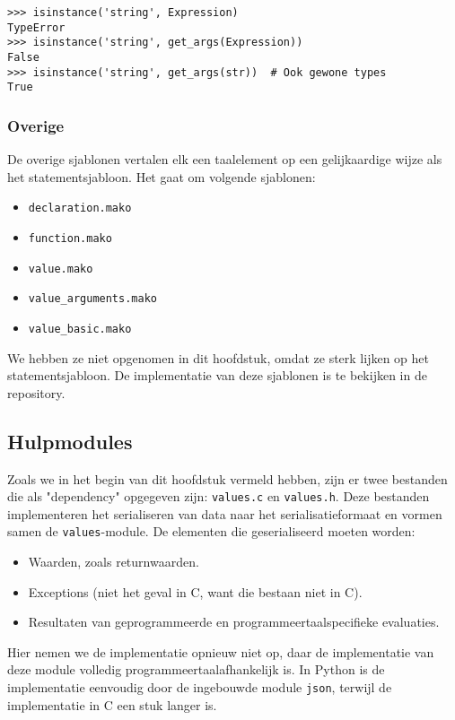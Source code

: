 \begin{verbatim}
>>> isinstance('string', Expression)
TypeError
>>> isinstance('string', get_args(Expression))
False
>>> isinstance('string', get_args(str))  # Ook gewone types
True
\end{verbatim}

\subsubsection{Overige}

De overige sjablonen vertalen elk een taalelement op een gelijkaardige wijze als het statementsjabloon.
Het gaat om volgende sjablonen:

\begin{itemize}
    \item \texttt{declaration.mako}
    \item \texttt{function.mako}
    \item \texttt{value.mako}
    \item \texttt{value\_arguments.mako}
    \item \texttt{value\_basic.mako}
\end{itemize}

We hebben ze niet opgenomen in dit hoofdstuk, omdat ze sterk lijken op het statementsjabloon.
De implementatie van deze sjablonen is te bekijken in de repository.

\subsection{Hulpmodules}\label{subsec:hulpmodules}

Zoals we in het begin van dit hoofdstuk vermeld hebben, zijn er twee bestanden die als "dependency" opgegeven zijn: \texttt{values.c} en \texttt{values.h}.
Deze bestanden implementeren het serialiseren van data naar het serialisatieformaat en vormen samen de \texttt{values}-module.
De elementen die geserialiseerd moeten worden:

\begin{itemize}
    \item Waarden, zoals returnwaarden.
    \item Exceptions (niet het geval in C, want die bestaan niet in C).
    \item Resultaten van geprogrammeerde en programmeertaalspecifieke evaluaties.
\end{itemize}

Hier nemen we de implementatie opnieuw niet op, daar de implementatie van deze module volledig programmeertaalafhankelijk is.
In Python is de implementatie eenvoudig door de ingebouwde module \texttt{json}, terwijl de implementatie in C een stuk langer is.

